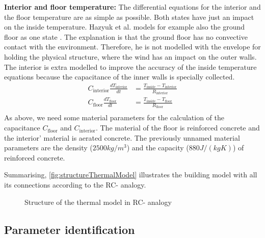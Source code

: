     \textbf{Interior and floor temperature:}\newline
    The differential equations for the interior and the floor temperature are as simple as possible. Both states have just an impact on the inside temperature. 
    Hazyuk et al. models for example also the ground floor as one state \cite{Hazyuk.2012}. The explanation is that the ground floor has no convective contact with the environment. Therefore, he is not modelled with the envelope for holding the physical structure, where the wind has an impact on the outer walls.
    The interior is extra modelled to improve the accuracy of the inside temperature equations because the capacitance of the inner walls is specially collected.
    \begin{align}
    C_\text{interior} \frac{d T_\text{interior}}{d t} &= \frac{T_\text{inside}-T_\text{interior}}{R_\text{interior}} \\
       C_\text{floor} \frac{d T_\text{floor}}{d t} &= \frac{T_\text{inside}-T_\text{floor}}{R_\text{floor}} \nonumber\\
    \end{align}
    As above, we need some material parameters for the calculation of the capacitance $C_\text{floor}$ and $C_\text{interior}$. The material of the floor is reinforced concrete and the interior' material is aerated concrete. The previously unnamed material parameters are the density ($2500 kg/m^3$) \cite{AntonSchweizer.12.10.2021} and the capacity ($880 J/(kg K)$) \cite{AntonSchweizer.12.10.2021b} of reinforced concrete.\newline
     
    Summarising, \autoref{fig:structureThermalModel} illustrates the building model with all its connections according to the RC- analogy.
    \begin{figure}[h]
            \centering
            \def\svgwidth{410pt}
            
            \caption{Structure of the thermal model in RC- analogy}
            \label{fig:structureThermalModel}
        \end{figure}
        
    \subsection{Parameter identification}
    \label{WorkflowModel}
    

